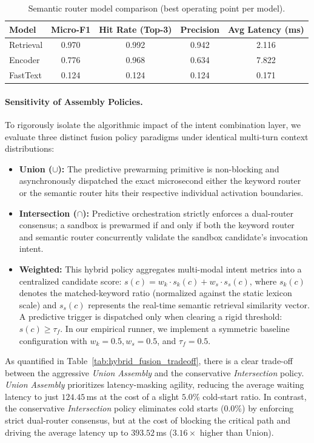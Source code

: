 \begin{table}[t]
\caption{Semantic router model comparison (best operating point per model).}
\label{tab:semantic_model_compare}
\centering
\small
\begin{tabular}{lcccc}
\toprule
Model & Micro-F1 & Hit Rate (Top-3) & Precision & Avg Latency (ms) \\
\midrule
Retrieval & 0.970 & 0.992 & 0.942 & 2.116 \\
Encoder & 0.776 & 0.968 & 0.634 & 7.822 \\
FastText & 0.124 & 0.124 & 0.124 & 0.171 \\
\bottomrule
\end{tabular}
\vspace{-4mm}
\end{table}

\paragraph{Sensitivity of Assembly Policies.}
To rigorously isolate the algorithmic impact of the intent combination layer, we evaluate three distinct fusion policy paradigms under identical multi-turn 
context distributions:
\begin{itemize}[leftmargin=1.2em]
    \item \textbf{Union ($\cup$):} The predictive prewarming primitive is non-blocking and asynchronously dispatched the exact microsecond either the keyword router or the semantic router hits their respective individual activation boundaries.
    \item \textbf{Intersection ($\cap$):} Predictive orchestration strictly enforces a dual-router consensus; a sandbox is prewarmed if and only if both the keyword router and semantic router concurrently validate the sandbox candidate's invocation intent.
    \item \textbf{Weighted:} This hybrid policy aggregates multi-modal intent metrics into a centralized candidate score: $s(c) = w_k \cdot s_k(c) + w_s \cdot s_s(c)$, 
    where $s_k(c)$ denotes the matched-keyword ratio (normalized against the static lexicon scale) and $s_s(c)$ represents the real-time semantic retrieval similarity vector. A predictive trigger is dispatched only when clearing a rigid threshold: $s(c) \geq \tau_f$. In our empirical runner, we implement a symmetric baseline configuration with $w_k = 0.5, w_s = 0.5$, and $\tau_f = 0.5$.
\end{itemize}

As quantified in Table~\ref{tab:hybrid_fusion_tradeoff}, there is a clear trade-off between the aggressive \textit{Union Assembly} and the conservative \textit{Intersection} policy. \textit{Union Assembly} prioritizes latency-masking agility, reducing the average waiting latency to just $124.45$\,ms at the cost of a slight $5.0\%$ cold-start ratio. In contrast, the conservative \textit{Intersection} policy eliminates cold starts ($0.0\%$) by enforcing strict dual-router consensus, but at the cost of blocking the critical path and driving the average latency up to $393.52$\,ms ($3.16\times$ higher than Union). 


